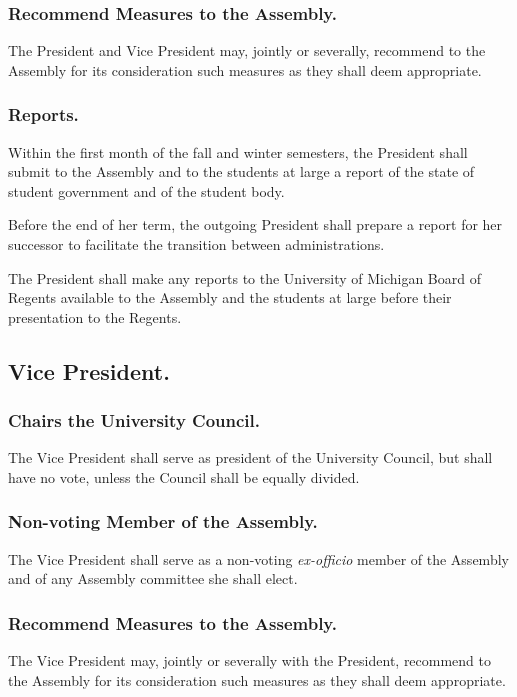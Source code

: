 \subsubsection{Recommend Measures to the Assembly.}
The President and Vice President may, jointly or severally, recommend to the Assembly for its consideration such measures as they shall deem appropriate.

\subsubsection{Reports.}

Within the first month of the fall and winter semesters, the President shall submit to the Assembly and to the students at large a report of the state of student government and of the student body.

Before the end of her term, the outgoing President shall prepare a report for her successor to facilitate the transition between administrations.

The President shall make any reports to the University of Michigan Board of Regents available to the Assembly and the students at large before their presentation to the Regents.


\subsection{Vice President.}
\subsubsection{Chairs the University Council.}
The Vice President shall serve as president of the University Council, but shall have no vote, unless the Council shall be equally divided.

\subsubsection{Non-voting Member of the Assembly.}
The Vice President shall serve as a non-voting \textit{ex-officio} member of the Assembly and of any Assembly committee she shall elect.

\subsubsection{Recommend Measures to the Assembly.}
The Vice President may, jointly or severally with the President, recommend to the Assembly for its consideration such measures as they shall deem appropriate.


